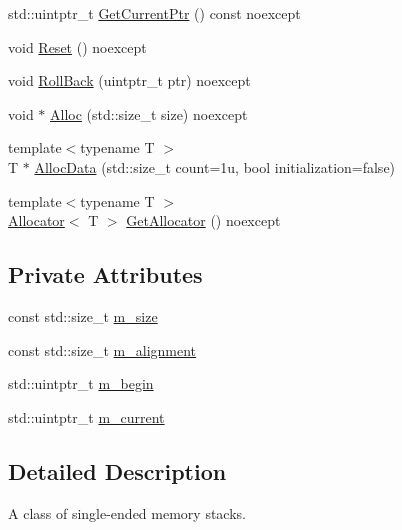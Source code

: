 \begin{DoxyCompactItemize}
\item 
std\+::uintptr\+\_\+t \mbox{\hyperlink{classmage_1_1_single_ended_memory_stack_a2924fbd6ee4a3f3cd82626f6a311991e}{Get\+Current\+Ptr}} () const noexcept
\item 
void \mbox{\hyperlink{classmage_1_1_single_ended_memory_stack_abd43ab7bd76655265123b934ea2bc7a7}{Reset}} () noexcept
\item 
void \mbox{\hyperlink{classmage_1_1_single_ended_memory_stack_afa1fcaa95a61995234759f9c57723202}{Roll\+Back}} (uintptr\+\_\+t ptr) noexcept
\item 
void $\ast$ \mbox{\hyperlink{classmage_1_1_single_ended_memory_stack_aab476200b7525b683ca13076f7770392}{Alloc}} (std\+::size\+\_\+t size) noexcept
\item 
{\footnotesize template$<$typename T $>$ }\\T $\ast$ \mbox{\hyperlink{classmage_1_1_single_ended_memory_stack_a169a8191a16fb2a0a69607ab9bd5a82e}{Alloc\+Data}} (std\+::size\+\_\+t count=1u, bool initialization=false)
\item 
{\footnotesize template$<$typename T $>$ }\\\mbox{\hyperlink{classmage_1_1_single_ended_memory_stack_1_1_allocator}{Allocator}}$<$ T $>$ \mbox{\hyperlink{classmage_1_1_single_ended_memory_stack_ad9fa222cb1a3b99b34b30ad4b7e75acf}{Get\+Allocator}} () noexcept
\end{DoxyCompactItemize}
\subsection*{Private Attributes}
\begin{DoxyCompactItemize}
\item 
const std\+::size\+\_\+t \mbox{\hyperlink{classmage_1_1_single_ended_memory_stack_a4259a859c62e5d461d71ec9c98162f53}{m\+\_\+size}}
\item 
const std\+::size\+\_\+t \mbox{\hyperlink{classmage_1_1_single_ended_memory_stack_a0a1ba6274a7fa64fd554edd40a32aec9}{m\+\_\+alignment}}
\item 
std\+::uintptr\+\_\+t \mbox{\hyperlink{classmage_1_1_single_ended_memory_stack_a2bac7d8cc59540fb3827bee13ffb6d3c}{m\+\_\+begin}}
\item 
std\+::uintptr\+\_\+t \mbox{\hyperlink{classmage_1_1_single_ended_memory_stack_a1cc0f3e486c68188213b12223dfae036}{m\+\_\+current}}
\end{DoxyCompactItemize}


\subsection{Detailed Description}
A class of single-\/ended memory stacks. 

